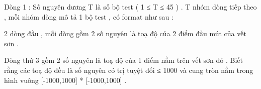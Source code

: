 Dòng 1 : Số nguyên dương T là số bộ test ( 1 ≤ T ≤ 45 ) . T nhóm dòng tiếp theo , mỗi nhóm dòng mô tả 1 bộ test , có format như sau :   


   2 dòng đầu , mỗi dòng gồm 2 số nguyên là toạ độ của 2 điểm đầu mút của vết sơn .   


   Dòng thứ 3 gồm 2 số nguyên là toạ độ của 1 điểm nằm trên vết sơn đó . Biết rằng các toạ độ đều là số nguyên có trị tuyệt đối ≤ 1000 và cung tròn nằm trong hình vuông [-1000,1000] * [-1000,1000] .
